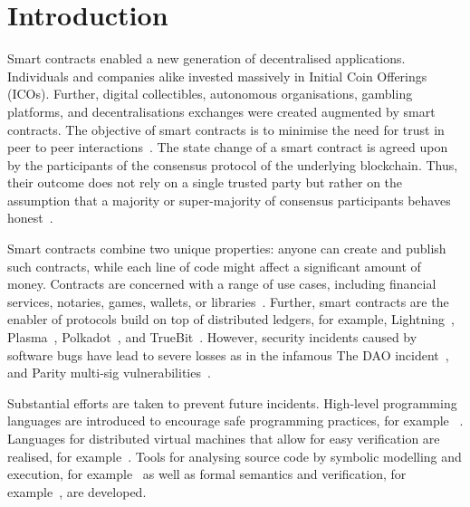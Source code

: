\section{Introduction}
Smart contracts enabled a new generation of decentralised applications.
Individuals and companies alike invested massively in Initial Coin Offerings (ICOs).
Further, digital collectibles, autonomous organisations, gambling platforms, and decentralisations exchanges were created augmented by smart contracts.
The objective of smart contracts is to minimise the need for trust in peer to peer interactions~\cite{Szabo1997}.
The state change of a smart contract is agreed upon by the participants of the consensus protocol of the underlying blockchain.
Thus, their outcome does not rely on a single trusted party but rather on the assumption that a majority or super-majority of consensus participants behaves honest~\cite{Nakamoto2008,Eyal2014}.

Smart contracts combine two unique properties: anyone can create and publish such contracts, while each line of code might affect a significant amount of money.
Contracts are concerned with a range of use cases, including financial services, notaries, games, wallets, or libraries~\cite{Bartoletti2017}.
Further, smart contracts are the enabler of protocols build on top of distributed ledgers, for example, Lightning~\cite{Poon2016}, Plasma~\cite{Poon2017}, Polkadot~\cite{Wood2017}, and TrueBit~\cite{Teutsch2017}.
However, security incidents caused by software bugs have lead to severe losses as in the infamous The DAO incident~\cite{Daian2016}, and Parity multi-sig vulnerabilities~\cite{Breidenbach2017Parity,ParityTech2017}. 

Substantial efforts are taken to prevent future incidents. 
High-level programming languages are introduced to encourage safe programming practices, for example ~\cite{Hirai2018Bamboo,Ethereum2018Vyper,Schrans2018}.
Languages for distributed virtual machines that allow for easy verification are realised, for example~\cite{Sergey2018,DynamicLedgerSolutions2017,Popejoy2017,Kasampalis2018}.
Tools for analysing source code by symbolic modelling and execution, for example~\cite{Luu2016,Tsankov2017,Kalra2018,Albert2018} as well as formal semantics and verification, for example~\cite{Bhargavan2016,Hildenbrandt2017,Hirai2017}, are developed.

